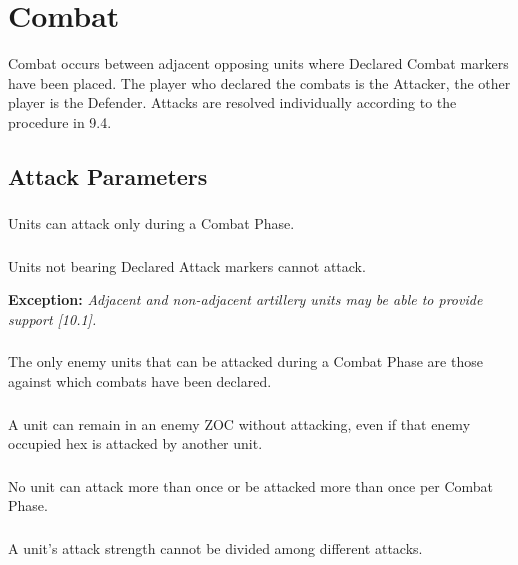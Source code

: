 \section{Combat}
Combat occurs between adjacent opposing units where Declared Combat markers have been placed. The player who declared the combats is the Attacker, the other player is the Defender. Attacks are resolved individually according to the procedure in 9.4.

\subsection{Attack Parameters}

\subsubsection{}
Units can attack only during a Combat Phase.

\subsubsection{}
Units not bearing Declared Attack markers cannot attack.

\textbf{Exception:} \textit{Adjacent and non-adjacent artillery units may be able to provide support [10.1].}

\subsubsection{}
The only enemy units that can be attacked during a Combat Phase are those against which combats have been declared.

\subsubsection{}
A unit can remain in an enemy ZOC without attacking, even if that enemy occupied hex is attacked by another unit.

\subsubsection{}No unit can attack more than once or be attacked more than once per Combat Phase.

\subsubsection{}
A unit's attack strength cannot be divided among different attacks.

